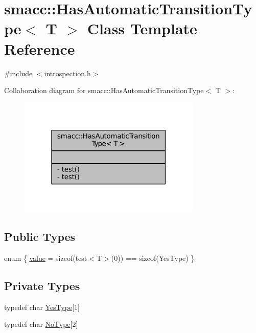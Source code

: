 \hypertarget{classsmacc_1_1HasAutomaticTransitionType}{}\section{smacc\+:\+:Has\+Automatic\+Transition\+Type$<$ T $>$ Class Template Reference}
\label{classsmacc_1_1HasAutomaticTransitionType}


{\ttfamily \#include $<$introspection.\+h$>$}



Collaboration diagram for smacc\+:\+:Has\+Automatic\+Transition\+Type$<$ T $>$\+:
\nopagebreak
\begin{figure}[H]
\begin{center}
\leavevmode
\includegraphics[width=247pt]{classsmacc_1_1HasAutomaticTransitionType__coll__graph}
\end{center}
\end{figure}
\subsection*{Public Types}
\begin{DoxyCompactItemize}
\item 
enum \{ \hyperlink{classsmacc_1_1HasAutomaticTransitionType_af7c2dd6009f2a3464a9b253b5eabe8e5ac3dba7514caf15e85491ccfd880b108b}{value} = sizeof(test$<$T$>$(0)) == sizeof(Yes\+Type)
 \}
\end{DoxyCompactItemize}
\subsection*{Private Types}
\begin{DoxyCompactItemize}
\item 
typedef char \hyperlink{classsmacc_1_1HasAutomaticTransitionType_a0261cbc759cb52b6f60495d327a088a4}{Yes\+Type}\mbox{[}1\mbox{]}
\item 
typedef char \hyperlink{classsmacc_1_1HasAutomaticTransitionType_a28c6f5359a0ce283d8f5705ed9fb0ceb}{No\+Type}\mbox{[}2\mbox{]}
\end{DoxyCompactItemize}

